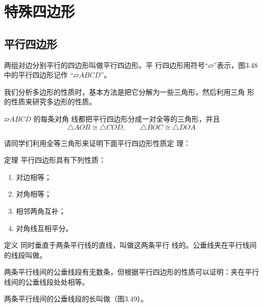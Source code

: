 \section{特殊四边形}
\subsection{平行四边形}
\begin{Definition}
两组对边分别平行的四边形叫做平行四边形。平
行四边形用符号“$\parallelogram$”表示，图3.48中的平行四边形记作
“$\parallelogram ABCD$”。
\end{Definition}


我们分析多边形的性质时，基本方法是把它分解为一些三角形，然后利用三角
形的性质来研究多边形的性质。

$\parallelogram ABCD$ 的每条对角
线都把平行四边形分成一对全等的三角形，并且
\[\triangle AOB\cong \triangle COD,\qquad \triangle BOC\cong \triangle DOA\]

请同学们利用全等三角形来证明下面平行四边形性质定
理：

\begin{Theorem}[平行四边形的性质定理]{定理}
平行四边形具有下列性质：
\begin{enumerate}
    \item 对边相等；
    \item 对角相等；
    \item 相邻两角互补；
    \item 对角线互相平分。
\end{enumerate}
\end{Theorem}

\begin{Definition}{定义} 
    同时垂直于两条平行线的直线，叫做这两条平行
线的。公垂线夹在平行线间的线段叫做。
\end{Definition}

两条平行线间的公垂线段有无数条，但根据平行四边形的性质可以证明：夹在平行线间的公垂线段处处相等。


\begin{Definition} 
两条平行线间的公垂线段的长叫做（图3.49）。
\end{Definition}

\begin{figure}
    \centering
{}
    \caption{}
\end{figure}

